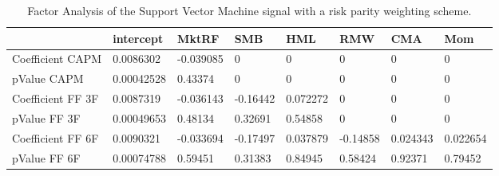 \begin{table}[H]
\centering
\begin{tabular}{llllllll}
\hline& intercept & MktRF & SMB & HML & RMW & CMA & Mom \\ 
\hline 
Coefficient CAPM & 0.0086302 & -0.039085 & 0 & 0 & 0 & 0 & 0 \\ 
pValue CAPM & 0.00042528 & 0.43374 & 0 & 0 & 0 & 0 & 0 \\ 
Coefficient FF 3F & 0.0087319 & -0.036143 & -0.16442 & 0.072272 & 0 & 0 & 0 \\ 
pValue FF 3F & 0.00049653 & 0.48134 & 0.32691 & 0.54858 & 0 & 0 & 0 \\ 
Coefficient FF 6F & 0.0090321 & -0.033694 & -0.17497 & 0.037879 & -0.14858 & 0.024343 & 0.022654 \\ 
pValue FF 6F & 0.00074788 & 0.59451 & 0.31383 & 0.84945 & 0.58424 & 0.92371 & 0.79452 \\ 
\hline
\end{tabular}
\caption{Factor Analysis of the Support Vector Machine signal with a risk parity weighting scheme.}
\label{SVM_MODEL_Risk_FACTOR}
\end{table}